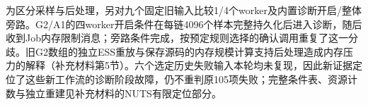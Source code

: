 为区分采样与后处理，另对九个固定旧输入比较1/4个worker及内置诊断开启/整体旁路。G2/A1的四worker开启条件在每链4096个样本完整持久化后进入诊断，随后收到Job内存限制消息；旁路条件完成，按预定规则选择的确认调用重复了这一分歧。旧G2数组的独立ESS重放与保存源码的内存规模计算支持后处理造成内存压力的解释（补充材料第5节）。六个选定历史失败输入本轮均未复现，因此新证据定位了这些新工作流的诊断阶段故障，仍不重判原105项失败；完整条件表、资源计数与独立重建见补充材料的NUTS有限定位部分。
